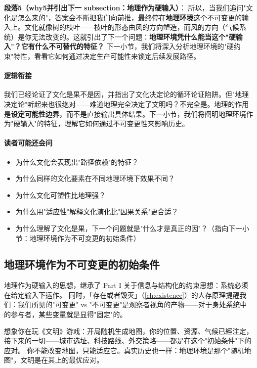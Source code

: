 \documentclass[../main.tex]{subfiles}
\begin{document}
	\textbf{段落5（why5并引出下一 subsection：地理作为硬输入）}：  
	所以，当我们追问"文化是怎么来的"，答案会不断把我们向前推，最终停在\textbf{地理环境}这个不可变更的输入上。文化就像树的枝叶——枝叶的形态由风的方向塑造，而风的方向（气候系统）是你无法改变的。这就引出了下一个问题：\textbf{地理环境凭什么能当这个"硬输入"？它有什么不可替代的特征？} 下一小节，我们将深入分析地理环境的"硬约束"特性，看看它如何通过决定生产可能性来锁定后续发展路径。
	
	\paragraph*{逻辑衔接}
	我们已经论证了文化是果不是因，并指出了文化决定论的循环论证陷阱。但"地理决定论"听起来也很绝对——难道地理完全决定了文明吗？不完全是。地理的作用是\textbf{设定可能性边界}，而不是直接输出具体结果。下一小节，我们将阐明地理环境作为"硬输入"的特征，理解它如何通过不可变更性来影响历史。
	
	\paragraph*{读者可能还会问}
	\begin{itemize}
\item 为什么文化会表现出"路径依赖"的特征？
	\item 为什么同样的文化要素在不同地理环境下效果不同？
	\item 为什么文化可塑性比地理强？
	\item 为什么用"适应性"解释文化演化比"因果关系"更合适？
	\item 为什么理解了文化是果，下一个问题就是"什么才是真正的因"？（指向下一小节：地理环境作为不可变更的初始条件）
\end{itemize}
	
	\subsection{地理环境作为不可变更的初始条件}
	
	

\begin{readingnote}
		地理作为硬输入的思想，继承了 Part I 关于信息与结构化的约束思想：系统必须在给定输入下运作。
	同时，「存在或者毁灭」（\ref{ch:existence}）的人存原理提醒我们：我们所见的"可变更" vs "不可变更"是观察者视角的产物——对于身处系统中的参与者，某些变量就是显得"固定"的。
\end{readingnote}

\begin{motivation}
				想象你在玩《文明》游戏：开局随机生成地图，你的位置、资源、气候已經注定，接下来的一切——城市选址、科技路线、外交策略——都是在这个"初始条件"下的应对。
		你不能改变地图，只能适应它。真实历史也一样：地理环境是那个"随机地图"，文明是在其上的最优应对。
	\end{motivation}
	
\end{document}
